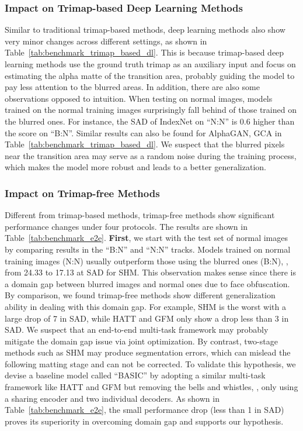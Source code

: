 \documentclass[sigconf]{acmart}
\begin{document}
\subsubsection{Impact on Trimap-based Deep Learning Methods}
Similar to traditional trimap-based methods, deep learning methods also show very minor changes across different settings, as shown in Table~\ref{tab:benchmark_trimap_based_dl}. This is because trimap-based deep learning methods use the ground truth trimap as an auxiliary input and focus on estimating the alpha matte of the transition area, probably guiding the model to pay less attention to the blurred areas. In addition, there are also some observations opposed to intuition. When testing on normal images, models trained on the normal training images surprisingly fall behind of those trained on the blurred ones. For instance, the SAD of IndexNet on ``N:N'' is 0.6 higher than the score on ``B:N''. Similar results can also be found for AlphaGAN, GCA in Table~\ref{tab:benchmark_trimap_based_dl}.
We suspect that the blurred pixels near the transition area may serve as a random noise during the training process, which makes the model more robust and leads to a better generalization. 

\subsubsection{Impact on Trimap-free Methods}
Different from trimap-based methods, trimap-free methods show significant performance changes under four protocols. The results are shown in Table~\ref{tab:benchmark_e2e}. \textbf{First}, we start with the test set of normal images by comparing results in the ``B:N'' and ``N:N'' tracks. Models trained on normal training images (N:N) usually outperform those using the blurred ones (B:N), , from 24.33 to 17.13 at SAD for SHM. This observation makes sense since there is a domain gap between blurred images and normal ones due to face obfuscation. By comparison, we found trimap-free methods show different generalization ability in dealing with this domain gap. For example, SHM is the worst with a large drop of 7 in SAD, while HATT and GFM only show a drop less than 3 in SAD. We suspect that an end-to-end multi-task framework may probably mitigate the domain gap issue via joint optimization. By contrast, two-stage methods such as SHM may produce segmentation errors, which can mislead the following matting stage and can not be corrected. To validate this hypothesis, we devise a baseline model called ``BASIC'' by adopting a similar multi-task framework like HATT and GFM but removing the bells and whistles, , only using a sharing encoder and two individual decoders. As shown in Table~\ref{tab:benchmark_e2e}, the small performance drop (less than 1 in SAD) proves its superiority in overcoming domain gap and supports our hypothesis.
\end{document}
